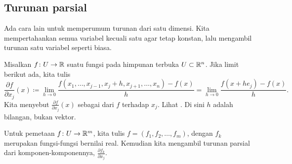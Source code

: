 \subsection{Turunan parsial}

Ada cara lain untuk memperumum turunan dari satu dimensi.
Kita mempertahankan semua variabel kecuali satu agar tetap konstan, lalu mengambil
turunan satu variabel seperti biasa.

\begin{defn}
Misalkan
$f \colon U \to {\mathbb{R}}$ suatu fungsi pada himpunan terbuka $U \subset {\mathbb{R}}^n$.
Jika limit berikut ada, kita tulis
\begin{equation*}
\frac{\partial f}{\partial x_j} (x) \coloneqq 
\lim_{h\to 0}\frac{f(x_1,\ldots,x_{j-1},x_j+h,x_{j+1},\ldots,x_n)-f(x)}{h}
=
\lim_{h\to 0}\frac{f(x+h e_j)-f(x)}{h} .
\end{equation*}
Kita menyebut
$\frac{\partial f}{\partial x_j} (x)$ sebagai \emph{}
dari $f$
terhadap $x_j$.  %
Lihat .
Di sini $h$ adalah bilangan, bukan vektor.

Untuk pemetaan $f \colon U \to {\mathbb{R}}^m$, kita tulis
$f = (f_1,f_2,\ldots,f_m)$, dengan $f_k$ merupakan fungsi-fungsi
bernilai real.  Kemudian kita mengambil turunan parsial dari
komponen-komponennya,
$\frac{\partial f_k}{\partial x_j}$.
\end{defn}

\begin{myfigureht}
\caption{Ilustrasi turunan parsial untuk fungsi $f \colon \R^2
\to \R$.  Bidang $yx_2$ dengan $x_1$ tetap ditandai oleh garis titik-titik,
dan kemiringan garis singgung pada bidang $yx_2$ adalah
$\frac{\partial f}{\partial x_2}(x_1,x_2)$.\label{fig:svpartder}}
\end{myfigureht}

